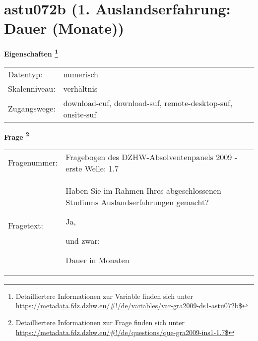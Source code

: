 
    \setcounter{footnote}{0}

    \vspace*{-1.8cm}
	\section{astu072b (1. Auslandserfahrung: Dauer (Monate))}
	\label{section:astu072b}



    \vspace*{0.5cm}
    \noindent\textbf{Eigenschaften
	\footnote{Detailliertere Informationen zur Variable finden sich unter
		\url{https://metadata.fdz.dzhw.eu/\#!/de/variables/var-gra2009-ds1-astu072b$}}}\\
	\begin{tabularx}{\hsize}{@{}lX}
	Datentyp: & numerisch \\
	Skalenniveau: & verhältnis \\
	Zugangswege: &
	  download-cuf, 
	  download-suf, 
	  remote-desktop-suf, 
	  onsite-suf
 \\
    \end{tabularx}



				\vspace*{0.5cm}
                \noindent\textbf{Frage
	                \footnote{Detailliertere Informationen zur Frage finden sich unter
		              \url{https://metadata.fdz.dzhw.eu/\#!/de/questions/que-gra2009-ins1-1.7$}}}\\
				\begin{tabularx}{\hsize}{@{}lX}
					Fragenummer: &
					  Fragebogen des DZHW-Absolventenpanels 2009 - erste Welle:
					  1.7
 \\
					Fragetext: & Haben Sie im Rahmen Ihres abgeschlossenen Studiums Auslandserfahrungen gemacht?\par  Ja,\par  und zwar:\par  Dauer in Monaten \\
				\end{tabularx}





